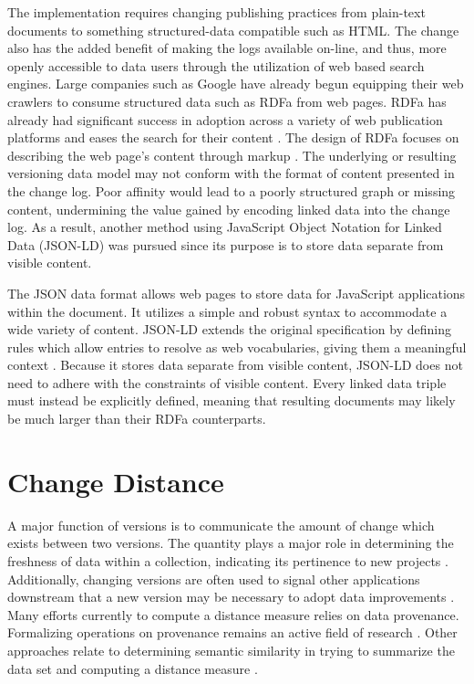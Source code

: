 The implementation requires changing publishing practices from plain-text documents to something structured-data compatible such as HTML.
The change also has the added benefit of making the logs available on-line, and thus, more openly accessible to data users through the utilization of web based search engines.
Large companies such as Google have already begun equipping their web crawlers to consume structured data such as RDFa from web pages.
RDFa has already had significant success in adoption across a variety of web publication platforms and eases the search for their content \cite{Bizer2013}.
The design of RDFa focuses on describing the web page's content through markup \cite{Herman2015}.
The underlying or resulting versioning data model may not conform with the format of content presented in the change log.
Poor affinity would lead to a poorly structured graph or missing content, undermining the value gained by encoding linked data into the change log.
As a result, another method using JavaScript Object Notation for Linked Data (JSON-LD) was pursued since its purpose is to store data separate from visible content.

The JSON data format allows web pages to store data for JavaScript applications within the document.
It utilizes a simple and robust syntax to accommodate a wide variety of content.
JSON-LD extends the original specification by defining rules which allow entries to resolve as web vocabularies, giving them a meaningful context \cite{JSONLD}.
Because it stores data separate from visible content, JSON-LD does not need to adhere with the constraints of visible content.
Every linked data triple must instead be explicitly defined, meaning that resulting documents may likely be much larger than their RDFa counterparts.

\section{Change Distance}

A major function of versions is to communicate the amount of change which exists between two versions.
The quantity plays a major role in determining the freshness of data within a collection, indicating its pertinence to new projects \cite{Bouzeghoub:2004:FAD:1012453.1012464}.
Additionally, changing versions are often used to signal other applications downstream that a new version may be necessary to adopt data improvements \cite{TILMES2011548}.
Many efforts currently to compute a distance measure relies on data provenance.
Formalizing operations on provenance remains an active field of research \cite{Ainy:2015:ASD:2806416.2806429}.
Other approaches relate to determining semantic similarity in trying to summarize the data set and computing a distance measure \cite{Hliaoutakis06informationretrieval}.

